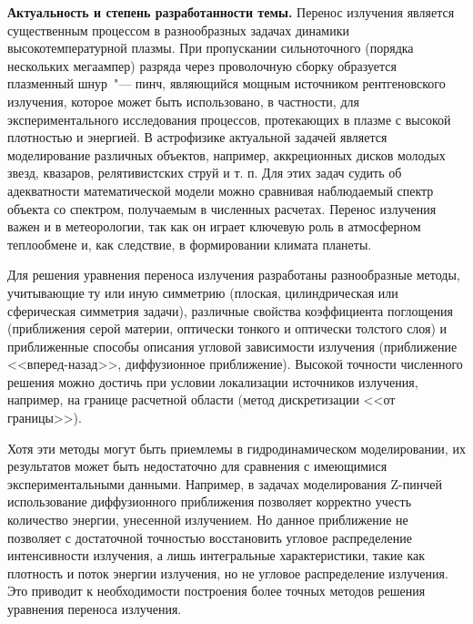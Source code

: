 \newcommand{\actuality}{{\textbf{Актуальность и степень разработанности темы.}}}
\newcommand{\aim}{{\textbf{Целями}}}
\newcommand{\tasks}{{\textbf{задачи}}}
\newcommand{\novelty}{{\textbf{Научная новизна:}}}
\newcommand{\influence}{{\textbf{Теоретическая и практическая значимость работы:}}}
\newcommand{\methodology}{{\textbf{Методология и методы исследования.}}}
\newcommand{\defpositions}{{\textbf{Положения, выносимые на~защиту}}}
\newcommand{\probation}{{\textbf{Степень достоверности и апробация работы.}}}

{\actuality} Перенос излучения является существенным процессом в разнообразных задачах динамики высокотемпературной плазмы.
При пропускании сильноточного (порядка нескольких мегаампер) разряда через проволочную сборку образуется плазменный шнур~"--- пинч,
являющийся мощным источником рентгеновского излучения, которое может быть использовано, в частности, для экспериментального исследования процессов, протекающих в плазме с высокой плотностью и энергией. 
В астрофизике актуальной задачей является моделирование различных объектов, например, аккреционных дисков молодых звезд, квазаров, релятивистских струй и т. п.
Для этих задач судить об адекватности математической модели можно сравнивая наблюдаемый спектр объекта со спектром, получаемым в численных расчетах.
Перенос излучения важен и в метеорологии, так как он играет ключевую роль в атмосферном теплообмене и, как следствие, в формировании климата планеты.

Для решения уравнения переноса излучения разработаны разнообразные методы, учитывающие ту или иную симметрию (плоская, цилиндрическая или сферическая симметрия задачи), различные свойства коэффициента поглощения (приближения серой материи, оптически тонкого и оптически толстого слоя) и приближенные способы описания угловой зависимости излучения (приближение <<вперед-назад>>, диффузионное приближение). Высокой точности численного решения можно достичь при условии локализации источников излучения, например, на границе расчетной области (метод дискретизации <<от границы>>). 

Хотя эти методы могут быть приемлемы в гидродинамическом моделировании, их результатов может быть недостаточно для сравнения с имеющимися экспериментальными данными. Например, в задачах моделирования Z-пинчей использование диффузионного приближения позволяет корректно учесть количество энергии, унесенной излучением. Но данное приближение не позволяет с достаточной точностью восстановить угловое распределение интенсивности излучения, а лишь интегральные характеристики, такие как плотность и поток энергии излучения, но не угловое распределение излучения. Это приводит к необходимости построения более точных методов решения уравнения переноса излучения.

